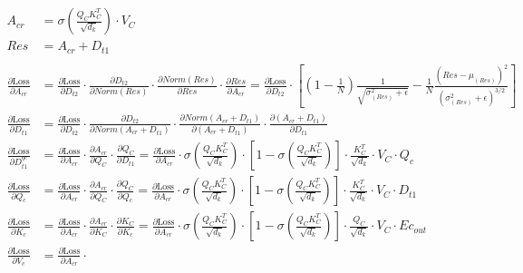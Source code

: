 \documentclass[12pt,letterpaper]{article}
\begin{document}
\begin{align*}
\\ %
A_{cr}&=\sigma\left(\frac{Q_{C} K_{C}^T}{\sqrt{d_k}}\right) \cdot V_{C}
\\
Res&=A_{cr}+ D_{t1}
\\ \\
\frac{\partial \text{Loss}}{\partial A_{cr}} &= %
\frac{\partial \text{Loss}}{\partial D_{t2}} \cdot 
\frac{\partial D_{t2}}{\partial Norm(Res)} \cdot
\frac{\partial Norm(Res)}{\partial Res} \cdot
\frac{\partial  Res}{\partial A_{cr}}=\frac{\partial \text{Loss}}{\partial D_{t2}} \cdot 
\left[(1-\frac{1}{N}) \frac{1}{\sqrt{\sigma^2_{(Res)}+\epsilon}}-\frac{1}{N}\frac{(Res-\mu_{(Res)})^2}{(\sigma^2_{(Res)}+\epsilon)^{3/2}}\right] 
\\
\frac{\partial \text{Loss}}{\partial D_{t1}} &= %
\frac{\partial \text{Loss}}{\partial D_{t2}} \cdot 
\frac{\partial D_{t2}}{\partial Norm(A_{cr}+D_{t1})} \cdot
\frac{\partial Norm(A_{cr}+D_{t1})}{\partial (A_{cr}+D_{t1})} \cdot
\frac{\partial  (A_{cr}+D_{t1})}{\partial D_{t1}}
\\
\frac{\partial \text{Loss}}{\partial D^{qc}_{t1}} &= %
\frac{\partial \text{Loss}}{\partial A_{cr}} \cdot 
\frac{\partial A_{cr}}{\partial Q_{C}}\cdot
\frac{\partial Q_{C}}{\partial D_{t1}}=
\frac{\partial \text{Loss}}{\partial A_{cr}}\cdot
\sigma\left(\frac{Q_{C} K_{C}^T}{\sqrt{d_k}}\right)\cdot \left[1-\sigma\left(\frac{Q_{C} K_{C}^T}{\sqrt{d_k}}\right)\right]\cdot
\frac{K_{C}^T}{\sqrt{d_k}}\cdot V_C \cdot Q_{c}
\\
\frac{\partial \text{Loss}}{\partial Q_{c}} &= %
\frac{\partial \text{Loss}}{\partial A_{cr}} \cdot 
\frac{\partial A_{cr}}{\partial Q_{C}}\cdot
\frac{\partial Q_{C}}{\partial Q_{c}}=
\frac{\partial \text{Loss}}{\partial A_{cr}}\cdot
\sigma\left(\frac{Q_{C} K_{C}^T}{\sqrt{d_k}}\right)\cdot \left[1-\sigma\left(\frac{Q_{C} K_{C}^T}{\sqrt{d_k}}\right)\right]\cdot
\frac{K_{C}^T}{\sqrt{d_k}}\cdot V_C \cdot D_{t1}
\\
\frac{\partial \text{Loss}}{\partial K_{c}} &= %
\frac{\partial \text{Loss}}{\partial A_{cr}} \cdot 
\frac{\partial A_{cr}}{\partial K_{C}}\cdot
\frac{\partial K_{C}}{\partial K_{c}}=
\frac{\partial \text{Loss}}{\partial A_{cr}}\cdot
\sigma\left(\frac{Q_{C} K_{C}^T}{\sqrt{d_k}}\right)\cdot \left[1-\sigma\left(\frac{Q_{C} K_{C}^T}{\sqrt{d_k}}\right)\right]\cdot
\frac{Q_{C}}{\sqrt{d_k}}\cdot V_C \cdot Ec_{out}
\\
\frac{\partial \text{Loss}}{\partial V_{c}} &= %
\frac{\partial \text{Loss}}{\partial A_{cr}} \cdot 

\end{align*}
\end{document}
